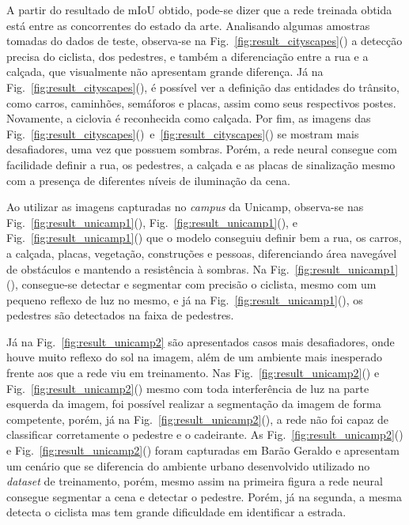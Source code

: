 \documentclass[conference]{IEEEtran}
\begin{document}
A partir do resultado de mIoU obtido, pode-se dizer que a rede treinada obtida está entre as concorrentes do estado da arte. Analisando algumas amostras tomadas do dados de teste, observa-se na Fig.~\ref{fig:result_cityscapes}() a detecção precisa do ciclista, dos pedestres, e também a diferenciação entre a rua e a calçada, que visualmente não apresentam grande diferença. Já na Fig.~\ref{fig:result_cityscapes}(), é possível ver a definição das entidades do trânsito, como carros, caminhões, semáforos e placas, assim como seus respectivos postes. Novamente, a ciclovia é reconhecida como calçada. Por fim, as imagens das Fig.~\ref{fig:result_cityscapes}()~e~\ref{fig:result_cityscapes}() se mostram mais desafiadores, uma vez que possuem sombras. Porém, a rede neural consegue com facilidade definir a rua, os pedestres, a calçada e as placas de sinalização mesmo com a presença de diferentes níveis de iluminação da cena.

Ao utilizar as imagens capturadas no \textit{campus} da Unicamp, observa-se nas  Fig.~\ref{fig:result_unicamp1}(), Fig.~\ref{fig:result_unicamp1}(), e Fig.~\ref{fig:result_unicamp1}() que o modelo conseguiu definir bem a rua, os carros, a calçada, placas, vegetação, construções e pessoas, diferenciando área navegável de obstáculos e mantendo a resistência à sombras. Na Fig.~\ref{fig:result_unicamp1}(), consegue-se detectar e segmentar com precisão o ciclista, mesmo com um pequeno reflexo de luz no mesmo, e já na Fig.~\ref{fig:result_unicamp1}(), os pedestres são detectados na faixa de pedestres. 

Já na Fig.~\ref{fig:result_unicamp2} são apresentados casos mais desafiadores, onde houve muito reflexo do sol na imagem, além de um ambiente mais inesperado frente aos que a rede viu em treinamento. Nas  Fig.~\ref{fig:result_unicamp2}() e Fig.~\ref{fig:result_unicamp2}() mesmo com toda interferência de luz na parte esquerda da imagem, foi possível realizar a segmentação da imagem de forma competente, porém, já na Fig.~\ref{fig:result_unicamp2}(), a rede não foi capaz de classificar corretamente o pedestre e o cadeirante. As Fig.~\ref{fig:result_unicamp2}() e Fig.~\ref{fig:result_unicamp2}() foram capturadas em Barão Geraldo e apresentam um cenário que se diferencia do ambiente urbano desenvolvido utilizado no \textit{dataset} de treinamento, porém, mesmo assim na primeira figura a rede neural consegue segmentar a cena e detectar o pedestre. Porém, já na segunda, a mesma detecta o ciclista mas tem grande dificuldade em identificar a estrada.
\end{document}
